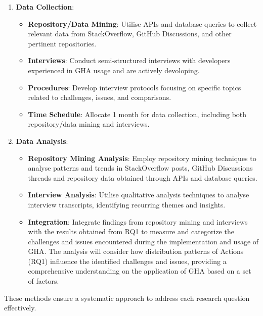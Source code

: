 \documentclass[conference]{IEEEtran}
\begin{document}
        \begin{enumerate}
            \item \textbf{Data Collection}:\\
            \begin{itemize}
                \item \textbf{Repository/Data Mining}: Utilise APIs and database queries to collect relevant data from StackOverflow, GitHub Discussions, and other pertinent repositories.
                \item \textbf{Interviews}: Conduct semi-structured interviews with developers experienced in GHA usage and are actively devoloping.
                \item \textbf{Procedures}: Develop interview protocols focusing on specific topics related to challenges, issues, and comparisons.
                \item \textbf{Time Schedule}: Allocate 1 month for data collection, including both repository/data mining and interviews.\\
            \end{itemize}
            
            \item \textbf{Data Analysis}:\\
            \begin{itemize}
                \item \textbf{Repository Mining Analysis}: Employ repository mining techniques to analyse patterns and trends in StackOverflow posts, GitHub Discussions threads and repository data obtained through APIs and database queries.
                \item \textbf{Interview Analysis}: Utilise qualitative analysis techniques to analyse interview transcripts, identifying recurring themes and insights.
                \item \textbf{Integration}: Integrate findings from repository mining and interviews with the results obtained from RQ1 to measure and categorize the challenges and issues encountered during the implementation and usage of GHA. The analysis will consider how distribution patterns of Actions (RQ1) influence the identified challenges and issues, providing a comprehensive understanding on the application of GHA based on a set of factors.\\
            \end{itemize}
        \end{enumerate}

        These methods ensure a systematic approach to address each research question effectively.\\
\end{document}
